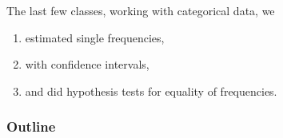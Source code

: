 %
%
%



\subtitle{$\chi^2$ between two samples}

\date{5 November 2015}






\begin{frame}
  \maketitle
\end{frame}


\begin{frame}{The last few classes,}
    working with \alert{categorical data}, we
  \begin{enumerate}
      \item estimated single frequencies,
      \item with confidence intervals,
      \item and did hypothesis tests for equality of frequencies.
  \end{enumerate}
\end{frame}

\begin{frame}\frametitle<presentation>{Outline}
  \tableofcontents
\end{frame}

